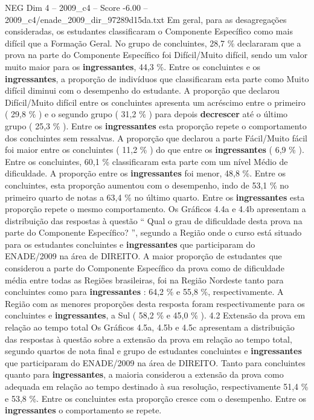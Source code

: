 \begin{textsample}{NEG Dim 4 – 2009\_c4 – Score -6.00 – 2009\_c4/enade\_2009\_dir\_97289d15da.txt}
Em geral, para as desagregações consideradas, os estudantes classificaram o Componente Específico como mais difícil que a Formação Geral.
No grupo de concluintes, 28,7 \% declararam que a prova na parte do Componente Específico foi Difícil/Muito difícil, sendo um valor muito maior para os \textbf{ingressantes}, 44,3 \%.
Entre os concluintes e os \textbf{ingressantes}, a proporção de indivíduos que classificaram esta parte como Muito difícil diminui com o desempenho do estudante.
A proporção que declarou Difícil/Muito difícil entre os concluintes apresenta um acréscimo entre o primeiro ( 29,8 \% ) e o segundo grupo ( 31,2 \% ) para depois \textbf{decrescer} até o último grupo ( 25,3 \% ).
Entre os \textbf{ingressantes} esta proporção repete o comportamento dos concluintes sem ressalvas.
A proporção que declarou a parte Fácil/Muito fácil foi maior entre os concluintes ( 11,2 \% ) do que entre os \textbf{ingressantes} ( 6,9 \% ).
Entre os concluintes, 60,1 \% classificaram esta parte com um nível Médio de dificuldade.
A proporção entre os \textbf{ingressantes} foi menor, 48,8 \%.
Entre os concluintes, esta proporção aumentou com o desempenho, indo de 53,1 \% no primeiro quarto de notas a 63,4 \% no último quarto.
Entre os \textbf{ingressantes} esta proporção repete o mesmo comportamento.
Os Gráficos 4.4a e 4.4b apresentam a distribuição das respostas à questão “ Qual o grau de dificuldade desta prova na parte do Componente Específico? ”, segundo a Região onde o curso está situado para os estudantes concluintes e \textbf{ingressantes} que participaram do ENADE/2009 na área de DIREITO.
A maior proporção de estudantes que considerou a parte do Componente Específico da prova como de dificuldade média entre todas as Regiões brasileiras, foi na Região Nordeste tanto para concluintes como para \textbf{ingressantes} : 64,2 \% e 55,8 \%, respectivamente.
A Região com as menores proporções desta resposta foram respectivamente para os concluintes e \textbf{ingressantes}, a Sul ( 58,2 \% e 45,0 \% ). 4.2 Extensão da prova em relação ao tempo total Os Gráficos 4.5a, 4.5b e 4.5c apresentam a distribuição das respostas à questão sobre a extensão da prova em relação ao tempo total, segundo quartos de nota final e grupo de estudantes concluintes e \textbf{ingressantes} que participaram do ENADE/2009 na área de DIREITO.
Tanto para concluintes quanto para \textbf{ingressantes}, a maioria considerou a extensão da prova como adequada em relação ao tempo destinado à sua resolução, respectivamente 51,4 \% e 53,8 \%.
Entre os concluintes esta proporção cresce com o desempenho.
Entre os \textbf{ingressantes} o comportamento se repete.

\end{textsample}

